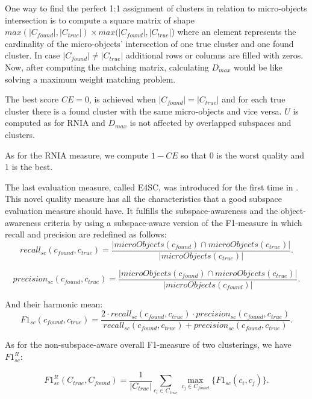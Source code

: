 One way to find the perfect 1:1 assignment of clusters in relation to micro-objects intersection is to compute a square matrix of shape $max(|C_{found}|,|C_{true}|) \times max(|C_{found}|,|C_{true}|$) where 
an element represents the cardinality of the micro-objects' intersection of one true cluster and one found cluster. In case $|C_{found}| \neq |C_{true}|$ additional rows or columns are filled with zeros. Now, after computing the matching matrix, calculating $D_{max}$ would be like solving a maximum weight matching problem.

The best score $CE = 0$, is achieved when $|C_{found}| = |C_{true}|$ and for each true cluster there is a found cluster with the same micro-objects and vice versa. $U$ is computed as for RNIA and $D_{max}$ is not affected by overlapped subspaces and clusters.

As for the RNIA measure, we compute $1 - CE$ so that 0 is the worst quality and 1 is the best.

The last evaluation measure, called E4SC, was introduced for the first time in \citep{10.1145/2063576.2063774}. This novel quality measure has all the characteristics that a good subspace evaluation measure should have. It fulfills the subspace-awareness and the object-awareness criteria by using a subspace-aware version of the F1-measure in which recall and precision are redefined as follows:
\begin{equation}
recall_{sc}(c_{found},c_{true}) = \frac{|microObjects(c_{found}) \cap microObjects(c_{true})|}{|microObjects(c_{true})|}.
\end{equation}

\begin{equation}
precision_{sc}(c_{found},c_{true}) = \frac{|microObjects(c_{found}) \cap microObjects(c_{true})|}{|microObjects(c_{found})|}.
\end{equation}

And their harmonic mean:
\begin{equation}
F1_{sc}(c_{found},c_{true}) = \frac{2\cdot recall_{sc}(c_{found},c_{true})\cdot precision_{sc}(c_{found},c_{true})}{recall_{sc}(c_{found},c_{true}) + precision_{sc}(c_{found},c_{true})}.
\end{equation}

As for the non-subspace-aware overall F1-measure of two clusterings, we have $F1^{R}_{sc}$:

\begin{equation}
F1^{R}_{sc}(C_{true},C_{found}) = \frac{1}{|C_{true}|} \sum _{c_{i}\in C_{true}} \max _{c_{j}\in C_{found}} \{F1_{sc}(c_{i},c_{j})\}.
\end{equation}

